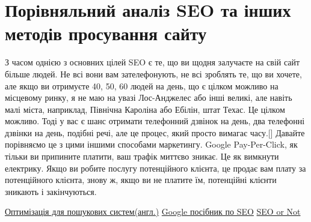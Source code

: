\documentclass[a4paper,12pt, titlepage]{article}
\begin{document}
    \section{Порівняльний аналіз SEO та інших методів просування сайту}

    \begin{displayquote}
        З часом однією з основних цілей SEO є те, що ви щодня залучаєте на свій сайт більше людей.
        Не всі вони вам зателефонують, не всі зроблять те, що ви хочете, але якщо ви отримуєте 40, 50, 60 людей на день,
        що є цілком можливо на місцевому ринку, я не маю на увазі Лос-Анджелес або інші великі, але навіть малі міста,
        наприклад, Північна Кароліна або Ебілін, штат Техас. Це цілком можливо.
        Тоді у вас є шанс отримати телефонний дзвінок на день, два телефонні дзвінки на день, подібні речі,
        але це процес, який просто вимагає часу.[\elipsis]
        Давайте порівняємо це з цими іншими способами маркетингу.
        Google Pay-Per-Click, як тільки ви припините платити, ваш трафік миттєво зникає.
        Це як вимкнути електрику.
        Якщо ви робите послугу потенційного клієнта, це продає вам плату за потенційного клієнта, знову ж,
        якщо ви не платите їм, потенційні клієнти зникають і закінчуються.\cite{seo_vs_notseo}
    \end{displayquote}



    \begin{thebibliography}{9}
        \href{https://en.wikipedia.org/wiki/Search_engine_optimization}{Оптимізація для пошукових систем(англ.)}
        \href{https://developers.google.com/search/docs/beginner/seo-starter-guide}{Google посібник по SEO}
        \href{https://www.speakeasymarketinginc.com/seo-search-engine-optimization-vs-other-web-marketing-methods-which-is-better/}{SEO or Not}
    \end{thebibliography}
\end{document}
